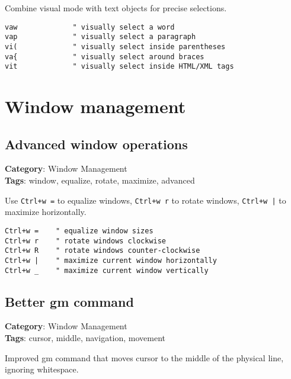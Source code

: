 {{{{{{{{{{{{{{{{{{{Combine visual mode with text objects for precise selections.

\begin{Exa*}{}
\begin{Verbatim}[fontsize=\footnotesize, breaklines, breakanywhere]
vaw             " visually select a word
vap             " visually select a paragraph  
vi(             " visually select inside parentheses
va{             " visually select around braces
vit             " visually select inside HTML/XML tags
\end{Verbatim}
\end{Exa*}

\chapter{Window management}
\section{Advanced window operations}

\textbf{Category}: Window Management\\ \textbf{Tags}: window, equalize, rotate, maximize, advanced
\vspace{0.5cm}

Use {\footnotesize \Verb§Ctrl+w =§} to equalize windows, {\footnotesize \Verb§Ctrl+w r§} to rotate windows, {\footnotesize \Verb§Ctrl+w |§} to maximize horizontally.

\begin{Exa*}{}
\begin{Verbatim}[fontsize=\footnotesize, breaklines, breakanywhere]
Ctrl+w =    " equalize window sizes
Ctrl+w r    " rotate windows clockwise
Ctrl+w R    " rotate windows counter-clockwise  
Ctrl+w |    " maximize current window horizontally
Ctrl+w _    " maximize current window vertically
\end{Verbatim}
\end{Exa*}

\section{Better gm command}

\textbf{Category}: Window Management\\ \textbf{Tags}: cursor, middle, navigation, movement
\vspace{0.5cm}

Improved gm command that moves cursor to the middle of the physical line, ignoring whitespace.

}}}}}}}}}}}}}}}}}}}
